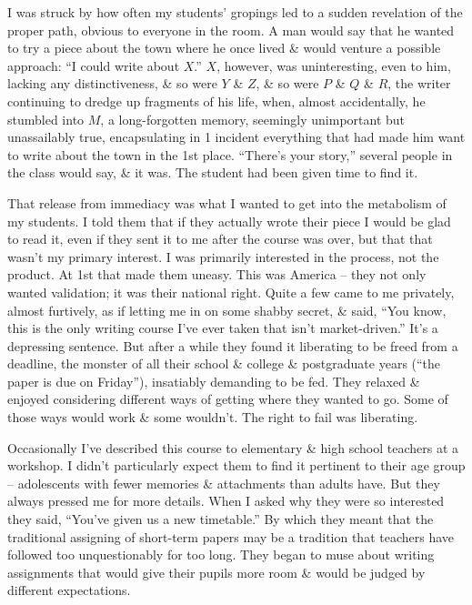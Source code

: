 \documentclass{article}
\numberwithin{equation}{section}
\begin{document}
I was struck by how often my students' gropings led to a sudden revelation of the proper path, obvious to everyone in the room. A man would say that he wanted to try a piece about the town where he once lived \& would venture a possible approach: ``I could write about $X$.'' $X$, however, was uninteresting, even to him, lacking any distinctiveness, \& so were $Y$ \& $Z$, \& so were $P$ \& $Q$ \& $R$, the writer continuing to dredge up fragments of his life, when, almost accidentally, he stumbled into $M$, a long-forgotten memory, seemingly unimportant but unassailably true, encapsulating in 1 incident everything that had made him want to write about the town in the 1st place. ``There's your story,'' several people in the class would say, \& it was. The student had been given time to find it.

That release from immediacy was what I wanted to get into the metabolism of my students. I told them that if they actually wrote their piece I would be glad to read it, even if they sent it to me after the course was over, but that that wasn't my primary interest. I was primarily interested in the process, not the product. At 1st that made them uneasy. This was America -- they not only wanted validation; it was their national right. Quite a few came to me privately, almost furtively, as if letting me in on some shabby secret, \& said, ``You know, this is the only writing course I've ever taken that isn't market-driven.'' It's a depressing sentence. But after a while they found it liberating to be freed from a deadline, the monster of all their school \& college \& postgraduate years (``the paper is due on Friday''), insatiably demanding to be fed. They relaxed \& enjoyed considering different ways of getting where they wanted to go. Some of those ways would work \& some wouldn't. The right to fail was liberating.

Occasionally I've described this course to elementary \& high school teachers at a workshop. I didn't particularly expect them to find it pertinent to their age group -- adolescents with fewer memories \& attachments than adults have. But they always pressed me for more details. When I asked why they were so interested they said, ``You've given us a new timetable.'' By which they meant that the traditional assigning of short-term papers may be a tradition that teachers have followed too unquestionably for too long. They began to muse about writing assignments that would give their pupils more room \& would be judged by different expectations.
\end{document}
